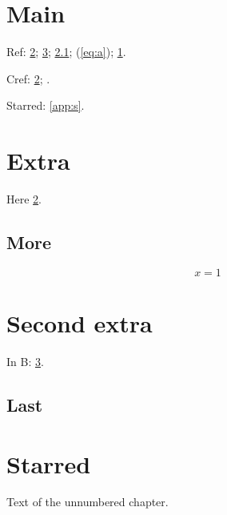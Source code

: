 \documentclass{scrreprt}
\begin{document}
\chapter{Main}\label{main}
Ref: \ref{app:a}; \ref{app:b}; \ref{sec:a}; (\ref{eq:a}); \ref{main}.

Cref: \cref{app:a}; .

Starred: \ref{app:s}.
\appendix
\chapter{Extra}\label{app:a}
Here \ref{app:a}.
\section{More}\label{sec:a}
\begin{equation}
x = 1 \label{eq:a}
\end{equation}
\chapter{Second extra}\label{app:b}
In B: \ref{app:b}.
\section{Last}
\chapter*{Starred}\label{app:s}
Text of the unnumbered chapter.
\end{document}
